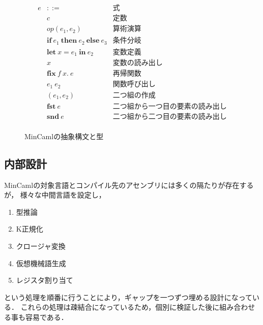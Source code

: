 \documentclass[T]{compsoft}
\newcommand{\keyword}[1]{\mathbf{#1}}
\newcommand{\IF}{\keyword{if}}
\newcommand{\THEN}{\keyword{then}}
\newcommand{\ELSE}{\keyword{else}}
\newcommand{\LET}{\keyword{let}}
\newcommand{\FIX}{\keyword{fix}}
\newcommand{\IN}{\keyword{in}}
\newcommand{\FST}{\keyword{fst}}
\newcommand{\SND}{\keyword{snd}}
\begin{document}
\begin{figure}[htbp]
	\[ \begin{array}{lll}
			e & ::= & \mbox{式} \\
				& c	& \mbox{定数} \\
				& \textit{op} (e_1, e_2) & \mbox{算術演算} \\
				& \IF~e_1~\THEN~e_2~\ELSE~e_3 & \mbox{条件分岐} \\
			 	& \LET~x=e_1~\IN~e_2 & \mbox{変数定義} \\
				& x & \mbox{変数の読み出し} \\
				& \FIX~f~x.~e & \mbox{再帰関数} \\
				& e_1~e_2 & \mbox{関数呼び出し} \\
				& (e_1,e_2) & \mbox{二つ組の作成} \\
				& \FST~e & \mbox{二つ組から一つ目の要素の読み出し} \\
				& \SND~e & \mbox{二つ組から二つ目の要素の読み出し} \\
	\end{array} \]
	\caption{MinCamlの抽象構文と型}
	\label{eqn:mincaml-ast}
\end{figure}

\subsection{内部設計}
MinCamlの対象言語とコンパイル先のアセンブリには多くの隔たりが存在するが，
様々な中間言語を設定し，
\begin{enumerate}
	\item 型推論
	\item K正規化
	\item クロージャ変換
	\item 仮想機械語生成
	\item レジスタ割り当て
\end{enumerate}
という処理を順番に行うことにより，ギャップを一つずつ埋める設計になっている．
これらの処理は疎結合になっているため，個別に検証した後に組み合わせる事も容易である．
\end{document}
